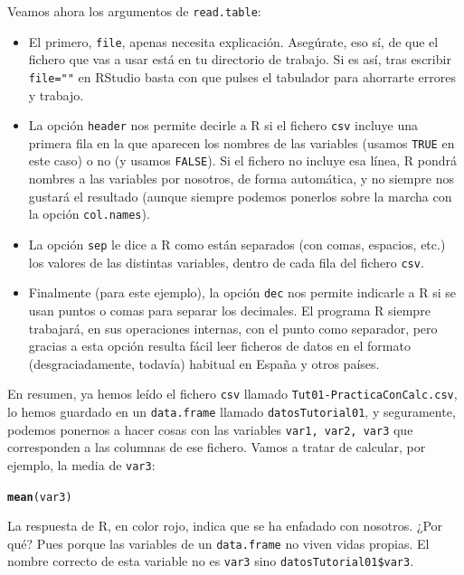 \documentclass[10pt,a4paper]{article}\usepackage[]{graphicx}\usepackage[]{color}
\makeatletter
\newcommand{\hlstd}[1]{\textcolor[rgb]{0.345,0.345,0.345}{#1}}%
\newcommand{\hlkwd}[1]{\textcolor[rgb]{0.737,0.353,0.396}{\textbf{#1}}}%
\newenvironment{kframe}{%
 \def\at@end@of@kframe{}%
 \ifinner\ifhmode%
  \def\at@end@of@kframe{\end{minipage}}%
  \begin{minipage}{\columnwidth}%
 \fi\fi%
 \def\FrameCommand##1{\hskip\@totalleftmargin \hskip-\fboxsep
 \colorbox{shadecolor}{##1}\hskip-\fboxsep
     \hskip-\linewidth \hskip-\@totalleftmargin \hskip\columnwidth}%
 \MakeFramed {\advance\hsize-\width
   \@totalleftmargin\z@ \linewidth\hsize
   \@setminipage}}%
 {\par\unskip\endMakeFramed%
 \at@end@of@kframe}
\newenvironment{knitrout}{}{} %
\newcounter {cont01}
\makeatother
\begin{document}
Veamos ahora los argumentos de {\tt read.table}:
\begin{itemize}
  \item El primero, {\tt file}, apenas necesita explicación. Asegúrate, eso sí, de que el fichero que vas a usar está en tu directorio de trabajo. Si es así, tras escribir {\tt file=""} en RStudio basta con que pulses el tabulador para ahorrarte errores y trabajo.
  \item La opción {\tt header} nos permite decirle a R si el fichero {\tt csv} incluye una primera fila en la que aparecen los nombres de las variables (usamos {\tt TRUE} en este caso) o no (y usamos {\tt FALSE}). Si el fichero no incluye esa línea, R pondrá nombres a las variables por nosotros, de forma automática, y no siempre nos gustará el resultado (aunque siempre podemos ponerlos sobre la marcha con la opción {\tt col.names}).
  \item La opción {\tt sep} le dice a R como están separados (con comas, espacios, etc.) los valores de las distintas variables, dentro de cada fila del fichero {\tt csv}.
  \item Finalmente (para este ejemplo), la opción {\tt dec} nos permite indicarle a R si se usan puntos o comas para separar los decimales. El programa R siempre trabajará, en sus operaciones internas, con el punto como separador, pero gracias a esta opción resulta fácil leer ficheros de datos en el formato (desgraciadamente, todavía) habitual en España y otros países.
\end{itemize}

En resumen, ya hemos leído el fichero {\tt csv} llamado {\tt Tut01-PracticaConCalc.csv}, lo hemos guardado en un {\tt data.frame} llamado {\tt datosTutorial01}, y seguramente, podemos ponernos a hacer cosas con las variables {\tt var1, var2, var3} que corresponden a las columnas de ese fichero. Vamos a tratar de calcular, por ejemplo, la media de {\tt var3}:
\begin{knitrout}
\color{fgcolor}\begin{kframe}
\begin{alltt}
\hlkwd{mean}\hlstd{(var3)}
\end{alltt}


{\ttfamily\noindent\bfseries\color{errorcolor}{\#\# Error in mean(var3): objeto 'var3' no encontrado}}\end{kframe}
\end{knitrout}
La respuesta de R, en color rojo, indica que se ha enfadado con nosotros. ¿Por qué? Pues porque las variables de un {\tt data.frame} no viven vidas propias. El nombre correcto de esta variable no es {\tt var3} sino   \verb#datosTutorial01$var3#.
\end{document}
